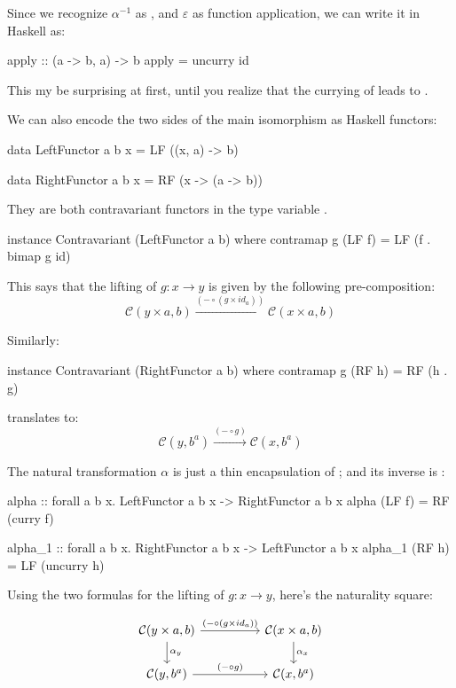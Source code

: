 \documentclass[DaoFP]{subfiles}
\begin{document}
Since we recognize $\alpha^{-1}$ as , and $\varepsilon$ as function application, we can write it in Haskell as:
\begin{haskell}
apply :: (a -> b, a) -> b
apply = uncurry id
\end{haskell}
This my be surprising at first, until you realize that the currying of  leads to .

We can also encode the two sides of the main isomorphism as Haskell functors:
\begin{haskell}
data LeftFunctor  a b x = LF ((x, a) -> b)
\end{haskell}
\begin{haskell}
data RightFunctor a b x = RF (x -> (a -> b))
\end{haskell}
They are both contravariant functors in the type variable .
\begin{haskell}
instance Contravariant (LeftFunctor a b) where
  contramap g (LF f) = LF (f . bimap g id)
\end{haskell}
This says that the lifting of $g \colon x \to y$ is given by the following pre-composition:
\[ \mathcal{C}(y \times a, b) \xrightarrow{(- \circ (g \times id_a)) }  \mathcal{C}(x \times a, b)\]

Similarly:
\begin{haskell}
instance Contravariant (RightFunctor a b) where
  contramap g (RF h) = RF (h . g)
\end{haskell}
translates to:
\[  \mathcal{C}(y, b^a) \xrightarrow{ (- \circ g) } \mathcal{C}(x, b^a) \]

The natural transformation $\alpha$ is just a thin encapsulation of ; and its inverse is :

\begin{haskell}
alpha :: forall a b x. LeftFunctor a b x -> RightFunctor a b x
alpha (LF f) = RF (curry f)
\end{haskell}

\begin{haskell}
alpha_1 :: forall a b x. RightFunctor a b x -> LeftFunctor a b x
alpha_1 (RF h) = LF (uncurry h)
\end{haskell}

Using the two formulas for the lifting of $g \colon x \to y$, here's the naturality square:

\[
 \begin{tikzcd}
 \mathcal{C}(y \times a, b)
 \arrow[rr, "(- \circ (g \times id_a))"]
 \arrow[d,  "\alpha_y"]
& &
\mathcal{C}(x \times a, b)
  \arrow[d, "\alpha_x"]
 \\
 \mathcal{C}(y, b^a)
 \arrow[rr, "(- \circ g)"]
& &
\mathcal{C}(x, b^a)
 \end{tikzcd}
\]
\end{document}
